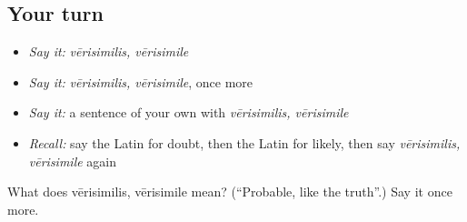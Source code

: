 \subsection*{Your turn}
\begin{itemize}
\raggedright
  \item \emph{Say it:} \emph{vērisimilis, vērisimile}
  \item \emph{Say it:} \emph{vērisimilis, vērisimile}, once more
  \item \emph{Say it:} a sentence of your own with \emph{vērisimilis, vērisimile}
  \item \emph{Recall:} say the Latin for doubt, then the Latin for likely, then say \emph{vērisimilis, vērisimile} again
\end{itemize}

\begin{tcolorbox}[breakable,colback=teal!4,colframe=teal!35!black,title={Before you move on}]
What does vērisimilis, vērisimile mean? (\textquotedblleft{}Probable, like the truth\textquotedblright{}.) Say it once more.
\end{tcolorbox}
